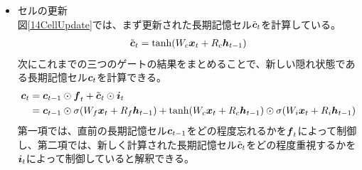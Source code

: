 \begin{itemize}
  \item セルの更新\\
  図\ref{14CellUpdate}では、まず更新された長期記憶セル$\tilde{{\mbox{\boldmath{$c$}}}}_t$を計算している。
\begin{equation}
 \begin{split}
  \tilde{{\mbox{\boldmath{$c$}}}}_t = \tanh (W_c {\mbox{\boldmath{$x$}}}_t + R_c {\mbox{\boldmath{$h$}}}_{t-1})
 \end{split}
\end{equation} 
  次にこれまでの三つのゲートの結果をまとめることで、新しい隠れ状態である長期記憶セル${\mbox{\boldmath{$c$}}}_{t}$を計算できる。
\begin{equation}
 \begin{split}
  {\mbox{\boldmath{$c$}}}_{t} 
  &= {\mbox{\boldmath{$c$}}}_{t-1} \odot {\mbox{\boldmath{$f$}}}_{t} + \tilde{\mbox{\boldmath{$c$}}}_{t}\odot{\mbox{\boldmath{$i$}}}_{t}\\
  &= {\mbox{\boldmath{$c$}}}_{t-1} \odot \sigma (W_f {\mbox{\boldmath{$x$}}}_t + R_f {\mbox{\boldmath{$h$}}}_{t-1}) 
  + \tanh (W_c {\mbox{\boldmath{$x$}}}_t + R_c {\mbox{\boldmath{$h$}}}_{t-1}) \odot \sigma (W_i {\mbox{\boldmath{$x$}}}_t + R_i {\mbox{\boldmath{$h$}}}_{t-1})
 \end{split}
\end{equation}
  第一項では、直前の長期記憶セル${\mbox{\boldmath{$c$}}}_{t-1}$をどの程度忘れるかを${\mbox{\boldmath{$f$}}}_{t}$によって制御し、第二項では、新しく計算された長期記憶セル$\tilde{\mbox{\boldmath{$c$}}}_{t}$をどの程度重視するかを${\mbox{\boldmath{$i$}}}_{t}$によって制御していると解釈できる。
    

\end{itemize}
